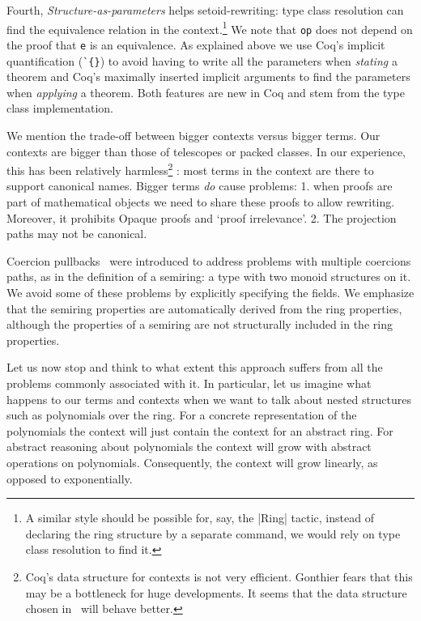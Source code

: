 \documentclass[a4paper,10pt,runningheads]{llncs}
\begin{document}
Fourth, \emph{Structure-as-parameters} helps setoid-rewriting: type class resolution
can find the equivalence relation in the context.\footnote{
A similar style should be possible for, say, the |Ring| tactic, instead of
declaring the ring structure by a separate command, we would rely on type class resolution to find it.}
We note that \lstinline|op| does not depend on the proof that \lstinline|e| is an equivalence. As explained above we use Coq's implicit quantification (\lstinline|`{}|) to avoid having to write all the parameters when \emph{stating} a theorem and Coq's maximally inserted implicit arguments to find the parameters when \emph{applying} a theorem. Both features are new in Coq and stem from the type class implementation.

We mention the trade-off between bigger contexts versus bigger terms. Our contexts are bigger than
those of telescopes or packed classes. In our experience, this has been relatively
harmless\footnote{Coq's data structure for contexts is not very efficient. Gonthier fears that this
may be a bottleneck for huge developments. It seems that the data structure chosen
in~\cite{asperti2009compact} will behave better.}%
: most terms in the context are there to support canonical names. Bigger terms
\emph{do} cause problems: 1. when proofs are part of mathematical objects we need to share these
proofs to allow rewriting. Moreover, it prohibits Opaque proofs and `proof irrelevance'. 2. The
projection paths may not be canonical.

Coercion pullbacks~\cite{Hints} were introduced to address problems with multiple coercions paths,
as in the definition of a semiring: a type with two monoid structures on it. We avoid some
of these problems by explicitly specifying the fields. We emphasize that the semiring properties are
automatically derived from the ring properties, although the properties of a semiring are not
structurally included in the ring properties.

Let us now stop and think to what extent this approach suffers from all the problems commonly
associated with it. In particular, let us imagine what happens to our terms and contexts when we
want to talk about nested structures such as polynomials over the ring. For a concrete
representation of the polynomials the context will just contain the context for an abstract ring.
For abstract reasoning about polynomials the context will grow with abstract operations on
polynomials. Consequently, the context will grow linearly, as opposed to exponentially.
\end{document}
